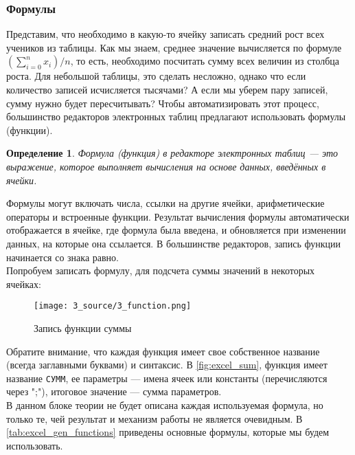 \documentclass[12pt]{article}
\newtheorem{definition}{Определение}[section]
\theoremstyle{problem_style}
\begin{document}
\subsubsection{Формулы}
Представим, что необходимо в какую-то ячейку записать средний рост всех учеников из таблицы. Как мы знаем, среднее значение вычисляется по формуле $(\sum_{i=0}^{n} x_i) / n$, то есть, необходимо посчитать сумму всех величин из столбца роста. Для небольшой таблицы, это сделать несложно, однако что если количество записей исчисляется тысячами? А если мы уберем пару записей, сумму нужно будет пересчитывать? Чтобы автоматизировать этот процесс, большинство редакторов  электронных таблиц предлагают использовать формулы (функции).
\begin{definition}
Формула (функция) в редакторе электронных таблиц — это выражение, которое выполняет вычисления на основе данных, введённых в ячейки.
\end{definition}
Формулы могут включать числа, ссылки на другие ячейки, арифметические операторы и встроенные функции. Результат вычисления формулы автоматически отображается в ячейке, где формула была введена, и обновляется при изменении данных, на которые она ссылается. В большинстве редакторов, запись функции начинается со знака равно.\\
Попробуем записать формулу, для подсчета суммы значений в некоторых ячейках:
\begin{figure}[H]
    \centering
    \texttt{[image: 3\_source/3\_function.png]}
    \caption{Запись функции суммы}
    \label{fig:excel_sum}
\end{figure}
Обратите внимание, что каждая функция имеет свое собственное название (всегда заглавными буквами) и синтаксис. В \autoref{fig:excel_sum}, функция имеет название \texttt{СУММ}, ее параметры  — имена ячеек или константы (перечисляются через ";"), итоговое значение — сумма параметров.\\
В данном блоке теории не будет описана каждая используемая формула, но только те, чей результат и механизм работы не является очевидным. В \autoref{tab:excel_gen_functions} приведены основные формулы, которые мы будем использовать.
\end{document}
